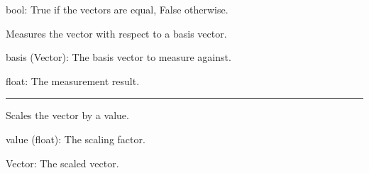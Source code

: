 \documentclass[letterpaper,10pt,english]{sphinxmanual}
\begin{document}
\begin{fulllineitems}
\begin{fulllineitems}
\begin{description}
\sphinxAtStartPar
bool: True if the vectors are equal, False otherwise.

\end{description}

\end{fulllineitems}


\begin{fulllineitems}
\label{\detokenize{index:utils.tensor.Vector.measure}}
\pysigstartsignatures
{}
\pysigstopsignatures
\sphinxAtStartPar
Measures the vector with respect to a basis vector.
\begin{description}
\sphinxAtStartPar
basis (Vector): The basis vector to measure against.

\sphinxAtStartPar
float: The measurement result.

\end{description}

\end{fulllineitems}



\bigskip\hrule\bigskip


\begin{fulllineitems}
\label{\detokenize{index:utils.tensor.Vector.scale}}
\pysigstartsignatures
{}
\pysigstopsignatures
\sphinxAtStartPar
Scales the vector by a value.
\begin{description}
\sphinxAtStartPar
value (float): The scaling factor.

\sphinxAtStartPar
Vector: The scaled vector.

\end{description}

\end{fulllineitems}



\end{fulllineitems}
\end{document}
